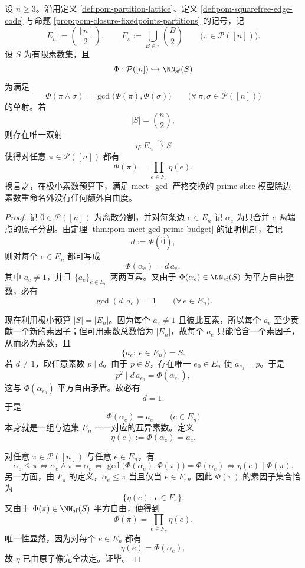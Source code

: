 \begin{theorem}\label{thm:conclusion-partition-primeslice-minimal-uniqueness}
设 \(n\ge 3\)。沿用定义 \ref{def:pom-partition-lattice}、定义 \ref{def:pom-squarefree-edge-code} 与命题 \ref{prop:pom-closure-fixedpoints-partitions} 的记号，记
\[
E_n:=\binom{[n]}2,
\qquad
F_\pi:=\bigcup_{B\in\pi}\binom{B}{2}
\qquad
\bigl(\pi\in\mathcal P([n])\bigr).
\]
设 \(S\) 为有限素数集，且
\[
\Phi:\mathcal P([n])\hookrightarrow \NN_{\mathrm{sf}}(S)
\]
为满足
\[
\Phi(\pi\wedge\sigma)=\gcd\bigl(\Phi(\pi),\Phi(\sigma)\bigr)
\qquad
\bigl(\forall\,\pi,\sigma\in\mathcal P([n])\bigr)
\]
的单射。若
\[
|S|=\binom{n}{2},
\]
则存在唯一双射
\[
\eta:E_n\overset{\sim}{\longrightarrow}S
\]
使得对任意 \(\pi\in\mathcal P([n])\) 都有
\[
\boxed{\;
\Phi(\pi)=\prod_{e\in F_\pi}\eta(e).\;}
\]
换言之，在极小素数预算下，满足 meet--\(\gcd\) 严格交换的 prime-slice 模型除边--素数重命名外没有任何额外自由度。
\end{theorem}
\begin{proof}
记 \(\hat 0\in\mathcal P([n])\) 为离散分割，并对每条边 \(e\in E_n\) 记 \(\alpha_e\) 为只合并 \(e\) 两端点的原子分割。由定理 \ref{thm:pom-meet-gcd-prime-budget} 的证明机制，若记
\[
d:=\Phi(\hat 0),
\]
则对每个 \(e\in E_n\) 都可写成
\[
\Phi(\alpha_e)=d\,a_e,
\]
其中 \(a_e\neq 1\)，并且 \(\{a_e\}_{e\in E_n}\) 两两互素。又由于 \(\Phi(\alpha_e)\in \NN_{\mathrm{sf}}(S)\) 为平方自由整数，必有
\[
\gcd(d,a_e)=1
\qquad
\bigl(\forall\,e\in E_n\bigr).
\]

现在利用极小预算 \(|S|=|E_n|\)。因为每个 \(a_e\neq 1\) 且彼此互素，所以每个 \(a_e\) 至少贡献一个新的素因子；但可用素数总数恰为 \(|E_n|\)，故每个 \(a_e\) 只能恰含一个素因子，从而必为素数，且
\[
\{a_e:\ e\in E_n\}=S.
\]
若 \(d\neq 1\)，取任意素数 \(p\mid d\)。由于 \(p\in S\)，存在唯一 \(e_0\in E_n\) 使 \(a_{e_0}=p\)。于是
\[
p^2\mid d\,a_{e_0}=\Phi(\alpha_{e_0}),
\]
这与 \(\Phi(\alpha_{e_0})\) 平方自由矛盾。故必有
\[
d=1.
\]
于是
\[
\Phi(\alpha_e)=a_e
\qquad
\bigl(e\in E_n\bigr)
\]
本身就是一组与边集 \(E_n\) 一一对应的互异素数。定义
\[
\eta(e):=\Phi(\alpha_e)=a_e.
\]

对任意 \(\pi\in\mathcal P([n])\) 与任意 \(e\in E_n\)，有
\[
\alpha_e\le \pi
\iff
\alpha_e\wedge\pi=\alpha_e
\iff
\gcd\bigl(\Phi(\alpha_e),\Phi(\pi)\bigr)=\Phi(\alpha_e)
\iff
\eta(e)\mid \Phi(\pi).
\]
另一方面，由 \(F_\pi\) 的定义，\(\alpha_e\le \pi\) 当且仅当 \(e\in F_\pi\)。因此 \(\Phi(\pi)\) 的素因子集合恰为
\[
\{\eta(e):\ e\in F_\pi\}.
\]
又由于 \(\Phi(\pi)\in \NN_{\mathrm{sf}}(S)\) 平方自由，便得到
\[
\Phi(\pi)=\prod_{e\in F_\pi}\eta(e).
\]
唯一性显然，因为对每个 \(e\in E_n\) 都有
\[
\eta(e)=\Phi(\alpha_e),
\]
故 \(\eta\) 已由原子像完全决定。证毕。
\end{proof}

